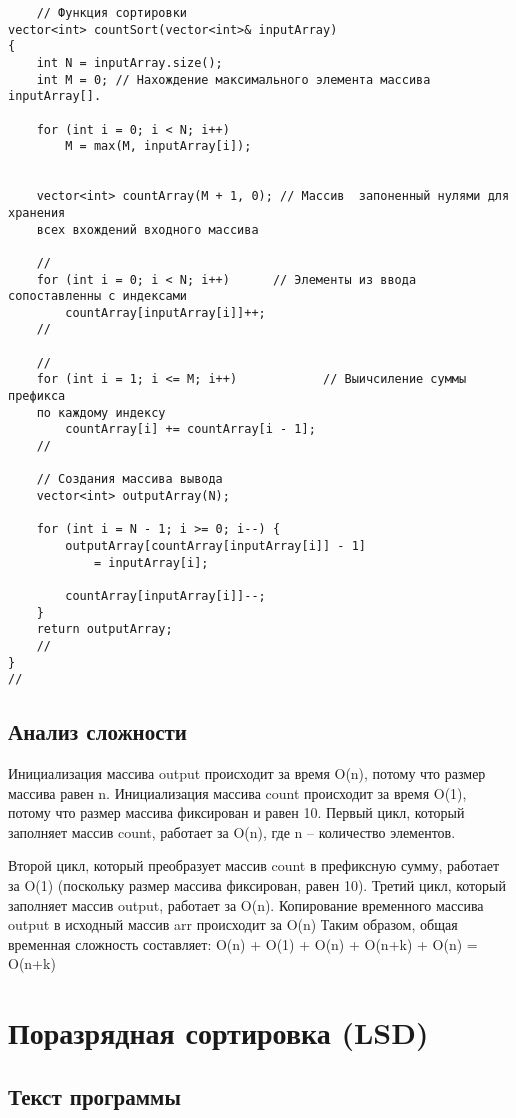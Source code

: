 \documentclass[bachelor, och, referat, times]{SCWorks}
\begin{document}
    \begin{verbatim}
    // Функция сортировки
vector<int> countSort(vector<int>& inputArray)
{
    int N = inputArray.size();
    int M = 0; // Нахождение максимального элемента массива inputArray[]. 

    for (int i = 0; i < N; i++)
        M = max(M, inputArray[i]);

   
    vector<int> countArray(M + 1, 0); // Массив  запоненный нулями для хранения 
    всех вхождений входного массива

    //
    for (int i = 0; i < N; i++)      // Элементы из ввода сопоставленны с индексами
        countArray[inputArray[i]]++;
    //

    //
    for (int i = 1; i <= M; i++)            // Выичсиление суммы префикса 
    по каждому индексу
        countArray[i] += countArray[i - 1];
    //

    // Создания массива вывода
    vector<int> outputArray(N);

    for (int i = N - 1; i >= 0; i--) {
        outputArray[countArray[inputArray[i]] - 1]
            = inputArray[i];

        countArray[inputArray[i]]--;
    }
    return outputArray;
    //
}
//
 \end{verbatim}


 \subsection{Анализ сложности}
 Инициализация массива output происходит за время O(n), потому что размер массива равен n.
Инициализация массива count происходит за время O(1), потому что размер массива фиксирован и равен 10.
Первый цикл, который заполняет массив count, работает за O(n), где n – количество элементов.

Второй цикл, который преобразует массив count в префиксную сумму, работает за O(1) 
(поскольку размер массива фиксирован, равен 10).
Третий цикл, который заполняет массив output, работает за O(n).
Копирование временного массива output в исходный массив arr происходит за O(n)
Таким образом, общая временная сложность составляет: O(n) + O(1) + O(n) + O(n+k) + O(n) = O(n+k)

\section{Поразрядная сортировка (LSD)}
\subsection{Текст программы}
\end{document}
